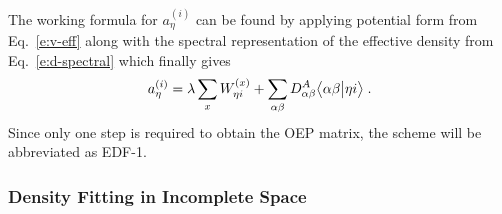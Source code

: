 %
%
The working formula for $a^{(i)}_\eta$ can be found by applying 
potential form from Eq.~\eqref{e:v-eff}
along with the spectral representation of the effective density from Eq.~\eqref{e:d-spectral} 
which finally gives
%
\begin{equation} \label{e:a-coeff-compl}
 a^{(i)}_\eta = \lambda \sum_{x} W_{\eta i}^{(x)} + 
 \sum_{\alpha\beta} D^A_{\alpha\beta} 
  \bigl\langle {\alpha\beta} \bigl\lvert {\eta i} \bigr\rangle \;.
\end{equation}
%
Since only one step is required to obtain the OEP matrix, the scheme will
be abbreviated as EDF-1.

\subsubsection{\label{sss:2.3.1.GDF-2}Density Fitting in Incomplete Space}

